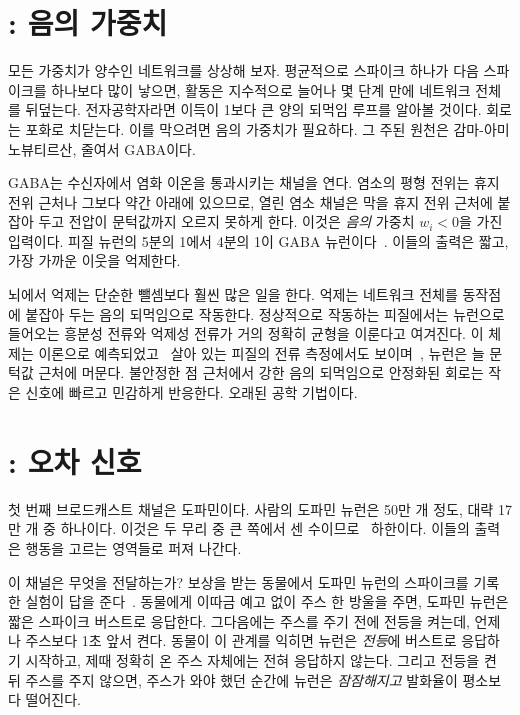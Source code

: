 \section{: 음의 가중치}

모든 가중치가 양수인 네트워크를 상상해 보자. 평균적으로 스파이크 하나가 다음 스파이크를 하나보다 많이 낳으면, 활동은 지수적으로 늘어나 몇 단계 만에 네트워크 전체를 뒤덮는다. 전자공학자라면 이득이 1보다 큰 양의 되먹임 루프를 알아볼 것이다. 회로는 포화로 치닫는다. 이를 막으려면 음의 가중치가 필요하다. 그 주된 원천은 감마-아미노뷰티르산, 줄여서 GABA이다.

GABA는 수신자에서 염화 이온을 통과시키는 채널을 연다. 염소의 평형 전위는 휴지 전위 근처나 그보다 약간 아래에 있으므로, 열린 염소 채널은 막을 휴지 전위 근처에 붙잡아 두고 전압이 문턱값까지 오르지 못하게 한다. 이것은 \emph{음의} 가중치 $w_i<0$을 가진 입력이다. 피질 뉴런의 5분의 1에서 4분의 1이 GABA 뉴런이다~\cite{Hendry1987}. 이들의 출력은 짧고, 가장 가까운 이웃을 억제한다.

뇌에서 억제는 단순한 뺄셈보다 훨씬 많은 일을 한다. 억제는 네트워크 전체를 동작점에 붙잡아 두는 음의 되먹임으로 작동한다. 정상적으로 작동하는 피질에서는 뉴런으로 들어오는 흥분성 전류와 억제성 전류가 거의 정확히 균형을 이룬다고 여겨진다. 이 체제는 이론으로 예측되었고~\cite{vanVreeswijk1996} 살아 있는 피질의 전류 측정에서도 보이며~\cite{Haider2006}, 뉴런은 늘 문턱값 근처에 머문다. 불안정한 점 근처에서 강한 음의 되먹임으로 안정화된 회로는 작은 신호에 빠르고 민감하게 반응한다. 오래된 공학 기법이다.

\section{: 오차 신호}

첫 번째 브로드캐스트 채널은 도파민이다. 사람의 도파민 뉴런은 50만 개 정도, 대략 17만 개 중 하나이다. 이것은 두 무리 중 큰 쪽에서 센 수이므로~\cite{Pakkenberg1991} 하한이다. 이들의 출력은 행동을 고르는 영역들로 퍼져 나간다.

이 채널은 무엇을 전달하는가? 보상을 받는 동물에서 도파민 뉴런의 스파이크를 기록한 실험이 답을 준다~\cite{Schultz1997}. 동물에게 이따금 예고 없이 주스 한 방울을 주면, 도파민 뉴런은 짧은 스파이크 버스트로 응답한다. 그다음에는 주스를 주기 전에 전등을 켜는데, 언제나 주스보다 1초 앞서 켠다. 동물이 이 관계를 익히면 뉴런은 \emph{전등}에 버스트로 응답하기 시작하고, 제때 정확히 온 주스 자체에는 전혀 응답하지 않는다. 그리고 전등을 켠 뒤 주스를 주지 않으면, 주스가 와야 했던 순간에 뉴런은 \emph{잠잠해지고} 발화율이 평소보다 떨어진다.

